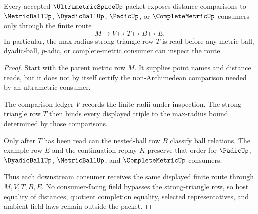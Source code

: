 \begin{theorem}
\label{thm:ultrametric-space-strong-triangle-handoff}
Every accepted $\UltrametricSpaceUp$ packet exposes distance comparisons to $\MetricBallUp$, $\DyadicBallUp$, $\PadicUp$, or $\CompleteMetricUp$ consumers only through the finite route
$$
M\longmapsto V\longmapsto T\longmapsto B\longmapsto E .
$$
In particular, the max-radius strong-triangle row $T$ is read before any metric-ball, dyadic-ball, $p$-adic, or complete-metric consumer can inspect the route.
\end{theorem}
\begin{proof}
Start with the parent metric row $M$. It supplies point names and distance reads, but it does not by itself certify the non-Archimedean comparison needed by an ultrametric consumer.

The comparison ledger $V$ records the finite radii under inspection. The strong-triangle row $T$ then binds every displayed triple to the max-radius bound determined by those comparisons.

Only after $T$ has been read can the nested-ball row $B$ classify ball relations. The example row $E$ and the continuation replay $K$ preserve that order for $\PadicUp$, $\DyadicBallUp$, $\MetricBallUp$, and $\CompleteMetricUp$ consumers.

Thus each downstream consumer receives the same displayed finite route through $M,V,T,B,E$. No consumer-facing field bypasses the strong-triangle row, so host equality of distances, quotient completion equality, selected representatives, and ambient field laws remain outside the packet.
\end{proof}

